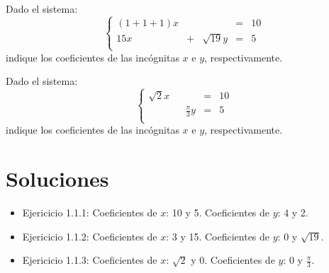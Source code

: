 \documentclass[12pt]{report}
\theoremstyle{largebreak}
\begin{document}
    \begin{excer}
        Dado el sistema:
        \begin{equation*}
            \left\{
                \begin{array}{ccccc}
                    (1+1+1)x &  &  & = & 10 \\
                    15x & + & \sqrt{19}y & = & 5 \\
                \end{array}
            \right.
        \end{equation*}
        indique los coeficientes de las incógnitas $x$ e $y$, respectivamente.
    \end{excer}

    \begin{excer}
        Dado el sistema:
        \begin{equation*}
            \left\{
                \begin{array}{ccccc}
                    \sqrt{2}x &  &  & = & 10 \\
                     &  & \frac{\pi}{3}y & = & 5 \\
                \end{array}
            \right.
        \end{equation*}
        indique los coeficientes de las incógnitas $x$ e $y$, respectivamente.
    \end{excer}

    \section{Soluciones}

    \begin{itemize}
        \item Ejericicio 1.1.1: Coeficientes de $x$: 10 y 5. Coeficientes de $y$: 4 y 2.
        \item Ejericicio 1.1.2: Coeficientes de $x$: 3 y 15. Coeficientes de $y$: 0 y $\sqrt{19}$.
        \item Ejericicio 1.1.3: Coeficientes de $x$: $\sqrt{2}$ y 0. Coeficientes de $y$: 0 y $\frac{\pi}{3}$.
    \end{itemize}
\end{document}

